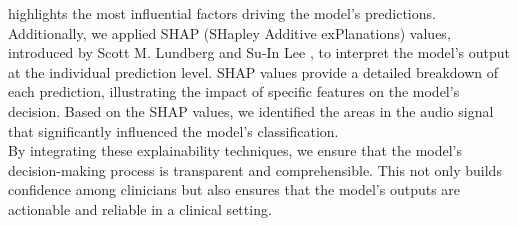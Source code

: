highlights the most influential factors driving the model's predictions.\\
Additionally, we applied SHAP (SHapley Additive exPlanations) values, introduced by Scott M. Lundberg and
Su{-}In Lee \cite{DBLP:journals/corr/LundbergL17}, to interpret the model's output at the individual prediction level.
SHAP values provide a detailed breakdown of each prediction, illustrating the impact of specific features on the model's decision.
Based on the SHAP values, we identified the areas in the audio signal that significantly influenced the model's classification.\\
By integrating these explainability techniques, we ensure that the model’s decision-making process is transparent and comprehensible.
This not only builds confidence among clinicians but also ensures that the model's outputs are actionable and reliable in a clinical setting.